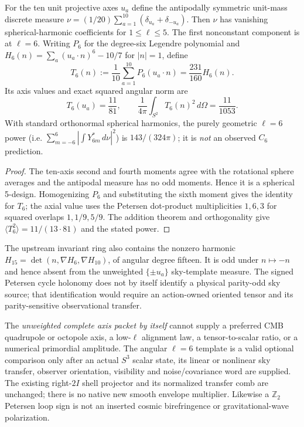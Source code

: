 \documentclass[12pt,a4paper]{article}
\begin{document}
\begin{proposition}
\label{p6b:prop:v322-angular-six}
For the ten unit projective axes $u_a$ define the antipodally symmetric
unit-mass discrete measure
$\nu=(1/20)\sum_{a=1}^{10}(\delta_{u_a}+\delta_{-u_a})$.
Then $\nu$ has vanishing spherical-harmonic coefficients for
$1\le\ell\le5$.  The first nonconstant component is at $\ell=6$.
Writing $P_6$ for the degree-six Legendre polynomial and
$H_6(n)=\sum_a(u_a\cdot n)^6-10/7$ for $|n|=1$, define
\[
 \boxed{T_6(n):=\frac1{10}\sum_{a=1}^{10}P_6(u_a\cdot n)
              =\frac{231}{160}H_6(n).}
\]
Its axis values and exact squared angular norm are
\[
 \boxed{T_6(u_a)=\frac{11}{81},\qquad
 \frac1{4\pi}\int_{S^2}T_6(n)^2\,d\Omega=\frac{11}{1053}.}
\]
With standard orthonormal spherical harmonics, the purely geometric
$\ell=6$ power (i.e. $\sum_{m=-6}^{6}|\int Y_{6m}^*\,d\nu|^2$) is
$143/(324\pi)$; it is \emph{not} an observed $C_6$ prediction.
\end{proposition}

\begin{proof}
The ten-axis second and fourth moments agree with the rotational
sphere averages and the antipodal measure has no odd moments.  Hence
it is a spherical 5-design.  Homogenizing $P_6$ and substituting the
sixth moment gives the identity for $T_6$; the axial value uses the
Petersen dot-product multiplicities $1,6,3$ for squared overlaps
$1,1/9,5/9$.  The addition theorem and orthogonality give
$\langle T_6^2\rangle=11/(13\cdot81)$ and the stated power.
\end{proof}

\begin{remark}
The upstream invariant ring also contains the nonzero harmonic
$H_{15}=\det(n,\nabla H_6,\nabla H_{10})$, of angular degree fifteen.
It is odd under $n\mapsto-n$ and hence absent from the unweighted
$\{\pm u_a\}$ sky-template measure.  The signed Petersen cycle
holonomy does not by itself identify a physical parity-odd sky source;
that identification would require an action-owned oriented tensor and
its parity-sensitive observational transfer.
\end{remark}

\begin{corollary}
\label{p6b:cor:v322-sky-firewall}
The \emph{unweighted complete axis packet by itself} cannot supply a
preferred CMB quadrupole or octopole axis, a low-$\ell$ alignment law,
a tensor-to-scalar ratio, or a numerical primordial amplitude.  The
angular $\ell=6$ template is a valid optional comparison only after an
actual $S^3$ scalar state, its linear or nonlinear sky transfer, observer
orientation, visibility and noise/covariance word are supplied.  The
existing right-$2I$ shell projector and its normalized transfer comb
are unchanged; there is no native new smooth envelope multiplier.
Likewise a $\mathbb Z_2$ Petersen loop sign is not an inserted cosmic
birefringence or gravitational-wave polarization.
\end{corollary}
\end{document}
